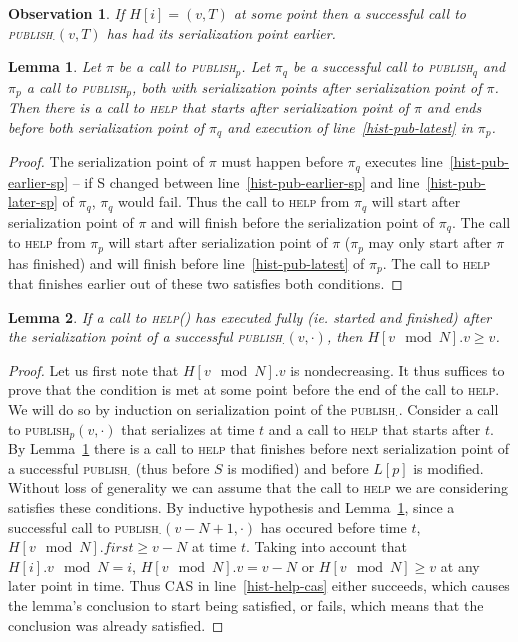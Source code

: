 \documentclass[a4paper,11pt]{article}
\newtheorem{lemma}{Lemma}
\newtheorem{observation}{Observation}
\newcommand{\fn}[1]{\textsc{#1}}
\begin{document}
\begin{observation}
\label{obs-hist-is-correct}
If $H[i] = (v, T)$ at some point then a successful call to \fn{publish$_\cdot$}$(v, T)$ has had its serialization point earlier.
\end{observation}

\begin{lemma}\label{lem-hist-help-comes}
Let $\pi$ be a call to \fn{publish$_p$}. Let $\pi_q$ be a successful call to \fn{publish$_q$} and $\pi_p$ a call to \fn{publish$_p$}, both with serialization points after serialization point of $\pi$. Then there is a call to \fn{help} that starts after serialization point of $\pi$ and ends before both serialization point of $\pi_q$ and execution of line~\ref{hist-pub-latest} in $\pi_p$.
\end{lemma}
\begin{proof}
The serialization point of $\pi$ must happen before $\pi_q$ executes line~\ref{hist-pub-earlier-sp} -- if S changed between line~\ref{hist-pub-earlier-sp} and line~\ref{hist-pub-later-sp} of $\pi_q$, $\pi_q$ would fail.
Thus the call to \fn{help} from $\pi_q$ will start after serialization point of $\pi$ and will finish before the serialization point of $\pi_q$. The call to \fn{help}
from $\pi_p$ will start after serialization point of $\pi$ ($\pi_p$ may only start after $\pi$ has finished) and will finish before line~\ref{hist-pub-latest} of $\pi_p$.
The call to \fn{help} that finishes earlier out of these two satisfies both conditions.
\end{proof}

\begin{lemma}
\label{lem-hist-is-complete}
If a call to \fn{help}() has executed fully (ie. started and finished) after the serialization point of a successful \fn{publish$_\cdot$}$(v, \cdot)$, then $H[v\mod N].v \geq v$.
\end{lemma}
\begin{proof}
Let us first note that $H[v\mod N].v$ is nondecreasing.
It thus suffices to prove that the condition is met at some point before the end of the call to \fn{help}. We will do so by induction on serialization point of the \fn{publish$_\cdot$}.
Consider a call to \fn{publish$_p$}$(v, \cdot)$ that serializes at time $t$ and a call to \fn{help} that starts after $t$. By Lemma~\ref{lem-hist-help-comes} there is a call to \fn{help} that finishes before next serialization point of a successful \fn{publish$_\cdot$} (thus before $S$
is modified) and before $L[p]$ is modified. Without loss of generality we can assume that the call to \fn{help} we are considering satisfies these conditions. By inductive hypothesis and Lemma~\ref{lem-hist-help-comes}, since a successful call to \fn{publish$_\cdot$}$(v-N+1, \cdot)$ has occured before time $t$, $H[v \mod N].first \geq v-N$ at time $t$. Taking into account that $H[i].v \mod N = i$, $H[v \mod N].v = v-N$ or $H[v \mod N] \geq v$ at any later point in time.
Thus CAS in line~\ref{hist-help-cas} either succeeds, which causes the lemma's conclusion to start being satisfied, or fails, which means that the conclusion was already satisfied.
\end{proof}
\end{document}
